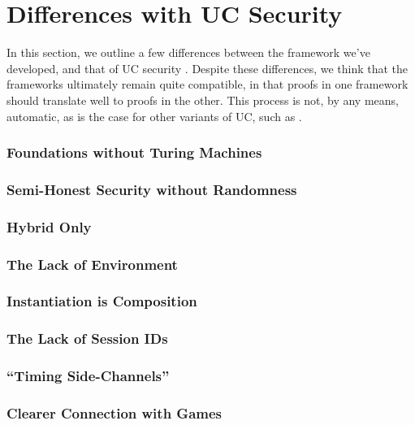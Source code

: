 \section{Differences with UC Security}

In this section, we outline a few differences between
the framework we've developed, and that of UC security
\cite{EPRINT:Canetti00}.
Despite these differences, we think that the frameworks
ultimately remain quite compatible, 
in that proofs in one framework should translate well
to proofs in the other.
This process is not, by any means, automatic,
as is the case for other variants of UC,
such as \cite{C:CanCohLin15}.

\subsubsection*{Foundations without Turing Machines}
\subsubsection*{Semi-Honest Security without Randomness}
\subsubsection*{Hybrid Only}
\subsubsection*{The Lack of Environment}
\subsubsection*{Instantiation is Composition}
\subsubsection*{The Lack of Session IDs}
\subsubsection*{``Timing Side-Channels''}
\subsubsection*{Clearer Connection with Games}